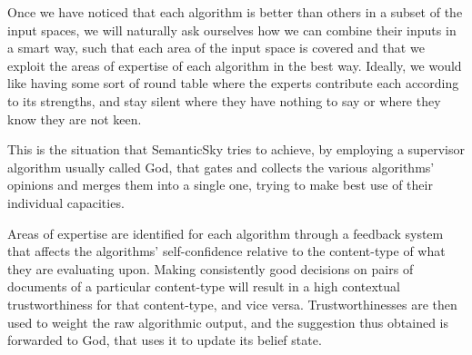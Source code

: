 \documentclass[11pt]{article}
\begin{document}
Once we have noticed that each algorithm is better than others in a subset of the input spaces, we will naturally ask ourselves how we can combine their inputs in a smart way, such that each area of the input space is covered and that we exploit the areas of expertise of each algorithm in the best way. Ideally, we would like having some sort of round table where the experts contribute each according to its strengths, and stay silent where they have nothing to say or where they know they are not keen.

This is the situation that SemanticSky tries to achieve, by employing a supervisor algorithm usually called God, that gates and collects the various algorithms' opinions and merges them into a single one, trying to make best use of their individual capacities.

Areas of expertise are identified for each algorithm through a feedback system that affects the algorithms' self-confidence relative to the content-type of what they are evaluating upon. Making consistently good decisions on pairs of documents of a particular content-type will result in a high contextual trustworthiness for that content-type, and vice versa.
Trustworthinesses are then used to weight the raw algorithmic output, and the suggestion thus obtained is forwarded to God, that uses it to update its belief state.
\end{document}
